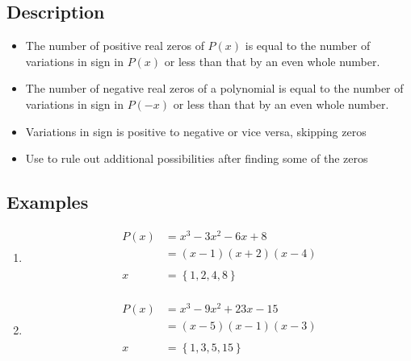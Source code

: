 \documentclass{exam}
\begin{document}
  \subsection{Description}
  \begin{itemize}
    \item The number of positive real zeros of $P(x)$ is equal to the number of variations in sign in $P(x)$ or less than that
      by an even whole number.

    \item The number of negative real zeros of a polynomial is equal to the number of variations in sign in $P(-x)$ or
      less than that by an even whole number.

    \item Variations in sign is positive to negative or vice versa, skipping zeros

    \item Use to rule out additional possibilities after finding some of the zeros
  \end{itemize}

  \subsection{Examples}

  \begin{enumerate}
    \item 
      \begin{align*}
        P(x)    &= x^3-3 x^2-6 x+8 \\
                &= (x - 1) (x + 2) (x - 4) \\
        \\
        x       &= \left\{ 1, 2, 4, 8 \right\} \\
      \end{align*}


    \item 
      \begin{align*}
        P(x)    &= x^3-9 x^2+23 x-15 \\
                &= (x - 5) (x - 1) (x - 3) \\
        \\
        x       &= \left\{ 1, 3, 5, 15 \right\} \\
      \end{align*}


  \end{enumerate}
\end{document}
